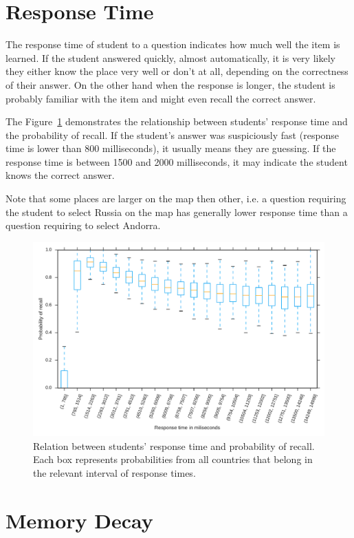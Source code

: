 \section{Response Time}

The response time of student to a question indicates how much well the item is learned. If the student answered quickly, almost automatically, it is very likely they either know the place very well or don't at all, depending on the correctness of their answer. On the other hand when the response is longer, the student is probably familiar with the item and might even recall the correct answer.

The Figure~\ref{fig-response-time} demonstrates the relationship between students' response time and the probability of recall. If the student's answer was suspiciously fast (response time is lower than 800 milliseconds), it usually means they are guessing. If the response time is between 1500 and 2000 milliseconds, it may indicate the student knows the correct answer.

Note that some places are larger on the map then other, i.e. a question requiring the student to select Russia on the map has generally lower response time than a question requiring to select Andorra.

\begin{figure}[htbp]
  \centering
  \includegraphics[width=\textwidth]{img/response-time}
  \caption{Relation between students' response time and probability of recall. Each box represents probabilities from all countries that belong in the relevant interval of response times.}
  \label{fig-response-time}
\end{figure}

\section{Memory Decay}

